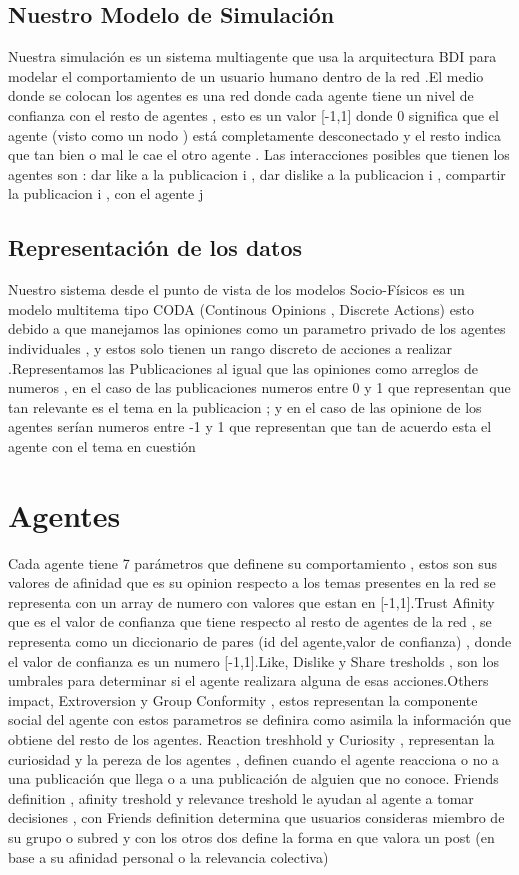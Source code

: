 \documentclass[acmtog]{acmart}
\begin{document}
\subsection{Nuestro Modelo de Simulación}

Nuestra simulación es un sistema multiagente que usa la arquitectura BDI para modelar el comportamiento de un usuario humano dentro de la red .El medio donde se colocan los agentes es una red donde cada agente tiene un nivel de confianza con el resto de agentes , esto es un valor [-1,1] donde 0 significa que el agente (visto como un nodo ) está completamente desconectado y el resto indica que tan bien o mal le cae el otro agente . Las interacciones posibles que tienen los agentes son : dar like a la publicacion i , dar dislike a la publicacion i , compartir la publicacion i , con el agente j 

\subsection{Representación de los datos}
Nuestro sistema desde el punto de vista de los modelos Socio-Físicos es un modelo multitema tipo CODA (Continous Opinions , Discrete Actions) esto debido a que manejamos las opiniones como un parametro privado de los agentes individuales , y estos solo tienen un rango discreto de acciones a realizar .Representamos las Publicaciones al igual que las opiniones como arreglos de numeros , en el caso de las publicaciones numeros entre 0 y 1 que representan que tan relevante es el tema en la publicacion ; y en el caso de las opinione de los agentes serían numeros entre -1 y 1 que representan que tan de acuerdo esta el agente con el tema en cuestión 

\section{Agentes}
Cada agente tiene 7 parámetros que definene su comportamiento , estos son sus valores de afinidad que es su opinion respecto a los temas presentes en la red se representa con un array de numero con valores que estan en [-1,1].Trust Afinity que es el valor de confianza que tiene respecto al resto de agentes de la red , se representa como un diccionario de pares (id del agente,valor de confianza) , donde el valor de confianza es un numero [-1,1].Like, Dislike y Share tresholds , son los umbrales para determinar si el agente realizara alguna de esas acciones.Others impact, Extroversion y Group Conformity , estos representan la componente social del agente con estos parametros se definira como asimila la información que obtiene del resto de los agentes. Reaction treshhold y Curiosity , representan la curiosidad y la pereza de los agentes , definen cuando el agente reacciona o no a una publicación que llega o a una publicación de alguien que no conoce. Friends definition , afinity treshold y relevance treshold le ayudan al agente a tomar decisiones , con Friends definition determina que usuarios consideras miembro de su grupo o subred y con los otros dos define la forma en que valora un post (en base a su afinidad personal o la relevancia colectiva)
\end{document}
